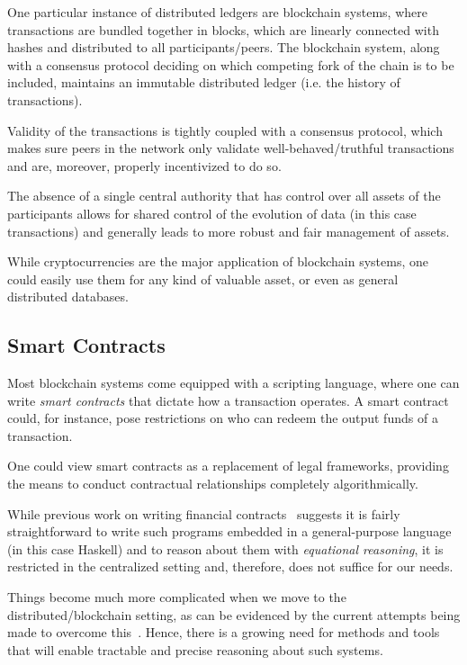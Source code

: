 \documentclass[acmsmall,nonacm=true,screen=true]{acmart}
\begin{document}
One particular instance of distributed ledgers are blockchain systems, where transactions are
bundled together in blocks, which are linearly connected with hashes and distributed to all participants/peers.
The blockchain system, along with a consensus protocol deciding on which competing fork of the chain is to be included,
maintains an immutable distributed ledger (i.e. the history of transactions).

Validity of the transactions is tightly coupled with a consensus protocol, which makes sure
peers in the network only validate well-behaved/truthful transactions and are, moreover,
properly incentivized to do so.

The absence of a single central authority that has control over all assets of the participants allows
for shared control of the evolution of data (in this case transactions)
and generally leads to more robust and fair management of assets.

While cryptocurrencies are the major application of blockchain systems, one could easily
use them for any kind of valuable asset, or even as general distributed databases.

\subsection{Smart Contracts} \label{subsec:smartcontracts}
Most blockchain systems come equipped with a scripting language, where one can write
\textit{smart contracts} that dictate how a transaction operates. A smart contract
could, for instance, pose restrictions on who can redeem the output funds of a transaction.

One could view smart contracts as a replacement of legal frameworks, providing the means
to conduct contractual relationships completely algorithmically.

While previous work on writing financial contracts~\cite{spj} suggests it
is fairly straightforward to write such programs embedded in a general-purpose
language (in this case Haskell) and to reason about them with \textit{equational reasoning},
it is restricted in the centralized setting and, therefore, does not suffice for our needs.

Things become much more complicated when we move to the distributed/blockchain setting, as
can be evidenced by the current attempts being made to overcome this~\cite{setzer,short,scilla}.
Hence, there is a growing need for methods and tools that will
enable tractable and precise reasoning about such systems.
\end{document}
